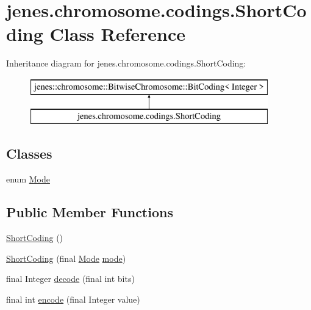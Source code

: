 \hypertarget{classjenes_1_1chromosome_1_1codings_1_1_short_coding}{\section{jenes.\-chromosome.\-codings.\-Short\-Coding Class Reference}
\label{classjenes_1_1chromosome_1_1codings_1_1_short_coding}
}
Inheritance diagram for jenes.\-chromosome.\-codings.\-Short\-Coding\-:\begin{figure}[H]
\begin{center}
\leavevmode
\includegraphics[height=2.000000cm]{classjenes_1_1chromosome_1_1codings_1_1_short_coding}
\end{center}
\end{figure}
\subsection*{Classes}
\begin{DoxyCompactItemize}
\item 
enum \hyperlink{enumjenes_1_1chromosome_1_1codings_1_1_short_coding_1_1_mode}{Mode}
\end{DoxyCompactItemize}
\subsection*{Public Member Functions}
\begin{DoxyCompactItemize}
\item 
\hyperlink{classjenes_1_1chromosome_1_1codings_1_1_short_coding_a0571cd23357dd77c1525ed09a5c28e61}{Short\-Coding} ()
\item 
\hyperlink{classjenes_1_1chromosome_1_1codings_1_1_short_coding_a6b6608f22e850e062f424033fae5e0bd}{Short\-Coding} (final \hyperlink{enumjenes_1_1chromosome_1_1codings_1_1_short_coding_1_1_mode}{Mode} \hyperlink{classjenes_1_1chromosome_1_1codings_1_1_short_coding_a39b438917e13117e9f68757a40f907c2}{mode})
\item 
final Integer \hyperlink{classjenes_1_1chromosome_1_1codings_1_1_short_coding_aa6c8649fe7e82bf923979d4afdfc9130}{decode} (final int bits)
\item 
final int \hyperlink{classjenes_1_1chromosome_1_1codings_1_1_short_coding_a140298d12b6d6a291b5849b9cc5b7400}{encode} (final Integer value)
\end{DoxyCompactItemize}
